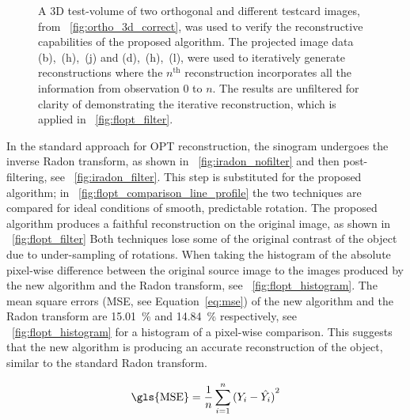\documentclass{osa-article}
\begin{document}
\begin{figure}
\begin{subfigure}[t]{0.2\linewidth}
    \end{subfigure}
    \caption[A 3D test-volume of two orthogonal and different testcard images, was used to verify the reconstructive capabilities of the proposed algorithm]{
    A 3D test-volume of two orthogonal and different testcard images, from \figurename~\ref{fig:ortho_3d_correct}, was used to verify the reconstructive capabilities of the proposed algorithm.
    The projected image data (b),~(h),~(j) and (d),~(h),~(l), were used to iteratively generate reconstructions where the \(n^\text{th}\) reconstruction incorporates all the information from observation 0 to \(n\).
    The results are unfiltered for clarity of demonstrating the iterative reconstruction, which is applied in \figurename~\ref{fig:flopt_filter}.
    }\label{fig:recon_iterative}
\end{figure}


In the standard approach for \gls{OPT} reconstruction, the sinogram undergoes the inverse \gls{Radon transform}, as shown in \figurename~\ref{fig:iradon_nofilter} and then post-filtering, see \figurename~\ref{fig:iradon_filter}.
This step is substituted for the proposed algorithm; in \figurename~\ref{fig:flopt_comparison_line_profile} the two techniques are compared for ideal conditions of smooth, predictable rotation.
The proposed algorithm produces %
a faithful reconstruction on the original image, as shown in \figurename~\ref{fig:flopt_filter} %
Both techniques lose some of the original contrast of the object due to under-sampling of rotations.
When taking the histogram of the absolute pixel-wise difference between the original source image to the images produced by the new algorithm and the \gls{Radon transform},
see \figurename~\ref{fig:flopt_histogram}.
The mean square errors (\gls{MSE}, see Equation~\eqref{eq:mse}) of the new algorithm and the \gls{Radon transform} are \SI{15.01}{\percent} and \SI{14.84}{\percent} respectively, see \figurename~\ref{fig:flopt_histogram} for a histogram of a pixel-wise comparison.
This suggests that the new algorithm is producing an accurate reconstruction of the object, similar to the standard \gls{Radon transform}.

\begin{align}
    \operatorname{\gls{MSE}}=\frac{1}{n}\sum_{i=1}^n{(Y_i-\hat{Y_i})}^2 \label{eq:mse} %
\end{align}
\end{document}
